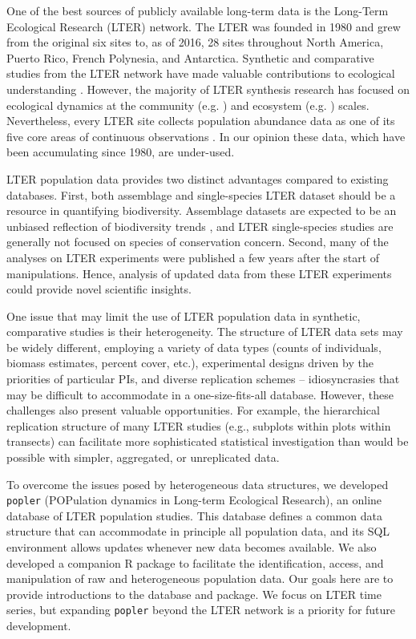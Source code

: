\documentclass{article}\usepackage[]{graphicx}\usepackage[]{color}
\begin{document}
One of the best sources of publicly available long-term data is the Long-Term Ecological Research (LTER) network. The LTER was founded in 1980 and grew from the original six sites to, as of 2016, 28 sites throughout North America, Puerto Rico, French Polynesia, and Antarctica. Synthetic and comparative studies from the LTER network have made valuable contributions to ecological understanding \citep{Knapp2012}. However, the majority of LTER synthesis research has focused on ecological dynamics at the community (e.g. \cite{Wilcox2017}) and ecosystem (e.g. \cite{Knapp2001}) scales. Nevertheless, every LTER site collects population abundance data as one of its five core areas of continuous observations \citep{Callahan1984}. In our opinion these data, which have been accumulating since 1980, are under-used.

LTER population data provides two distinct advantages compared to existing databases. First, both assemblage and single-species LTER dataset should be a resource in quantifying biodiversity. Assemblage datasets are expected to be an unbiased reflection of biodiversity trends \citep{dornelas2019balance}, and LTER single-species studies are generally not focused on species of conservation concern. Second, many of the analyses on LTER experiments were published a few years after the start of manipulations. Hence, analysis of updated data from these LTER experiments could provide novel scientific insights.

One issue that may limit the use of LTER population data in synthetic, comparative studies is their heterogeneity. The structure of LTER data sets may be widely different, employing a variety of data types (counts of individuals, biomass estimates, percent cover, etc.), experimental designs driven by the priorities of particular PIs, and diverse replication schemes – idiosyncrasies that may be difficult to accommodate in a one-size-fits-all database. However, these challenges also present valuable opportunities. For example, the hierarchical replication structure of many LTER studies (e.g., subplots within plots within transects) can facilitate more sophisticated statistical investigation than would be possible with simpler, aggregated, or unreplicated data. %

To overcome the issues posed by heterogeneous data structures, we developed \texttt{popler} (POPulation dynamics in Long-term Ecological Research), an online database of LTER population studies. This database defines a common data structure that can accommodate in principle all population data, and its SQL environment allows updates whenever new data becomes available. We also developed a companion R package to facilitate the identification, access, and manipulation of raw and heterogeneous population data. Our goals here are to provide introductions to the database and package. We focus on LTER time series, but expanding \texttt{popler} beyond the LTER network is a priority for future development.
\end{document}
